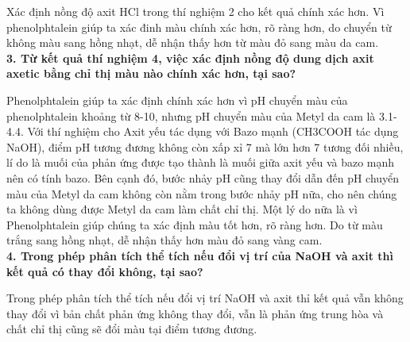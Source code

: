 \documentclass[12pt,a4paper]{report}
\begin{document}
Xác định nồng độ axit HCl trong thí nghiệm 2 cho kết quả chính xác hơn. Vì phenolphtalein giúp ta xác đinh màu chính xác hơn, rõ ràng hơn, do chuyển từ không màu sang hồng nhạt, dễ nhận thấy hơn từ màu đỏ sang màu da cam. \\
\textbf{3. Từ kết quả thí nghiệm 4, việc xác định nồng độ dung dịch axit axetic bằng chỉ thị màu nào chính xác hơn, tại sao?}

Phenolphtalein giúp ta xác định chính xác hơn vì pH chuyển màu của phenolphtalein khoảng từ 8-10, nhưng pH chuyển màu của Metyl da cam là 3.1- 4.4. Với thí nghiệm cho Axit yếu tác dụng với Bazo mạnh (CH3COOH tác dụng NaOH), điểm pH tương đương không còn xấp xỉ 7 mà lớn hơn 7 tương đối nhiều, lí do là muối của phản ứng được tạo thành là muối giữa axit yếu và bazo mạnh nên có tính bazo. Bên cạnh đó, bước nhảy pH cũng thay đổi dẫn đến pH chuyển màu của Metyl da cam không còn nằm trong bước nhảy pH nữa, cho nên chúng ta không dùng được Metyl da cam làm chất chỉ thị. Một lý do nữa là vì Phenolphtalein giúp chúng ta xác định màu tốt hơn, rõ ràng hơn. Do từ màu trắng sang hồng nhạt, dễ nhận thấy hơn màu đỏ sang vàng cam. \\
\textbf{4. Trong phép phân tích thể tích nếu đổi vị trí của NaOH và axit thì kết quả có thay đổi không, tại sao? }

Trong phép phân tích thể tích nếu đổi vị trí NaOH và axit thỉ kết quả vẫn không thay đổi vì bản chất phản ứng không thay đổi, vẫn là phản ứng trung hòa và chất chỉ thị cũng sẽ đổi màu tại điểm tương đương.  
\end{document}
